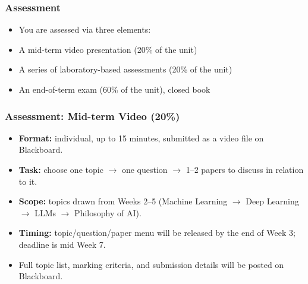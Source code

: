 \documentclass[10pt]{beamer}
\begin{document}
\begin{frame}[fragile]
\frametitle{Assessment}

\begin{itemize}
\item You are assessed via three elements:
\end{itemize}

\centerline{
}

\vspace{10pt}
\begin{itemize}
\item A mid-term video presentation (20\% of the unit)
\item A series of laboratory-based assessments (20\% of the unit)
\item An end-of-term exam (60\% of the unit), closed book
\end{itemize}

\end{frame}
\begin{frame}[fragile]
\frametitle{Assessment: Mid-term Video (20\%)}

\begin{itemize}
\item \textbf{Format:} individual, up to 15 minutes, submitted as a video
  file on Blackboard.
\item \textbf{Task:} choose one topic $\to$ one question $\to$ 1--2
  papers to discuss in relation to it.
\item \textbf{Scope:} topics drawn from Weeks 2--5 (Machine Learning
  $\to$ Deep Learning $\to$ LLMs $\to$ Philosophy of AI).
\item \textbf{Timing:} topic/question/paper menu will be released by the end of
  Week 3; deadline is mid Week 7.
\item Full topic list, marking criteria, and submission details will be
  posted on Blackboard.
\end{itemize}

\end{frame}
\end{document}

